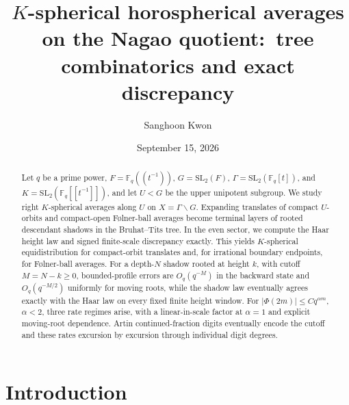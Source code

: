 \documentclass[11pt]{amsart}
\title[Spherical averages on the Nagao quotient]
{$K$-spherical horospherical averages on the Nagao quotient:\ tree combinatorics and exact discrepancy}
\author{Sanghoon Kwon}
\date{September 15, 2026}
\theoremstyle{definition}
\theoremstyle{plain}
\begin{document}
\begin{abstract}
Let \(q\) be a prime power, \(F=\mathbb F_q(\!(t^{-1})\!)\),
\(G=\mathrm{SL}_2(F)\),
\(\Gamma=\mathrm{SL}_2(\mathbb F_q[t])\), and
\(K=\mathrm{SL}_2(\mathbb F_q[\![t^{-1}]\!])\), and let \(U<G\) be the upper
unipotent subgroup.  We study right \(K\)-spherical averages along \(U\) on
\(X=\Gamma\backslash G\).  Expanding translates of compact \(U\)-orbits and
compact-open F{\o}lner-ball averages become terminal layers of rooted
descendant shadows in the Bruhat--Tits tree.  In the even sector, we compute
the Haar height law and
signed finite-scale discrepancy exactly.  This yields \(K\)-spherical
equidistribution for compact-orbit translates
and, for irrational boundary endpoints, for F{\o}lner-ball averages.  For a
depth-\(N\) shadow rooted at height \(k\), with cutoff \(M=N-k\ge0\),
bounded-profile errors are \(O_q(q^{-M})\) in the backward state and
\(O_q(q^{-M/2})\) uniformly for moving roots, while the
shadow law eventually agrees exactly with the Haar law on every fixed finite
height window.  For \(|\Phi(2m)|\le Cq^{\alpha m}\), \(\alpha<2\), three rate
regimes arise, with a linear-in-scale factor at \(\alpha=1\) and explicit
moving-root dependence.  Artin continued-fraction digits eventually encode the
cutoff and these rates excursion by excursion through individual digit
degrees.
\end{abstract}

\maketitle
\tableofcontents

\section{Introduction}
\end{document}
